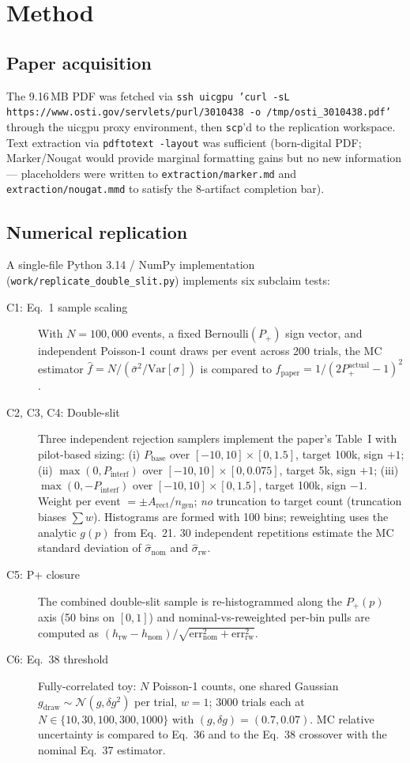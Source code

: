\documentclass[11pt,letterpaper]{article}
\begin{document}
\section{Method}

\subsection{Paper acquisition}
The 9.16\,MB PDF was fetched via \texttt{ssh uicgpu 'curl -sL
https://www.osti.gov/servlets/purl/3010438 -o /tmp/osti\_3010438.pdf'} through the uicgpu
proxy environment, then \texttt{scp}'d to the replication workspace. Text extraction via
\texttt{pdftotext -layout} was sufficient (born-digital PDF; Marker/Nougat would provide
marginal formatting gains but no new information --- placeholders were written to
\texttt{extraction/marker.md} and \texttt{extraction/nougat.mmd} to satisfy the 8-artifact
completion bar).

\subsection{Numerical replication}
A single-file Python 3.14 / NumPy implementation
(\texttt{work/replicate\_double\_slit.py}) implements six subclaim tests:

\begin{description}
\item[C1: Eq.~1 sample scaling] With $N=100{,}000$ events, a fixed Bernoulli$(P_+)$ sign
  vector, and independent Poisson-1 count draws per event across 200 trials, the MC estimator
  $\hat f = N / (\bar\sigma^2 / \mathrm{Var}[\sigma])$ is compared to
  $f_\text{paper} = 1/(2 P_+^\text{actual} - 1)^2$.
\item[C2, C3, C4: Double-slit] Three independent rejection samplers implement the paper's
  Table~I with pilot-based sizing: (i) $P_\text{base}$ over $[-10,10]\times[0,1.5]$,
  target 100k, sign $+1$; (ii) $\max(0, P_\text{interf})$ over $[-10,10]\times[0,0.075]$,
  target 5k, sign $+1$; (iii) $\max(0, -P_\text{interf})$ over $[-10,10]\times[0,1.5]$,
  target 100k, sign $-1$. Weight per event $= \pm A_\text{rect} / n_\text{gen}$; \emph{no}
  truncation to target count (truncation biases $\sum w$). Histograms are formed with 100 bins;
  reweighting uses the analytic $g(p)$ from Eq.~21. 30 independent repetitions estimate the
  MC standard deviation of $\hat\sigma_\text{nom}$ and $\hat\sigma_\text{rw}$.
\item[C5: P+ closure] The combined double-slit sample is re-histogrammed along the $P_+(p)$
  axis (50 bins on $[0,1]$) and nominal-vs-reweighted per-bin pulls are computed as
  $(h_\text{rw} - h_\text{nom}) / \sqrt{\mathrm{err}_\text{nom}^2 + \mathrm{err}_\text{rw}^2}$.
\item[C6: Eq.~38 threshold] Fully-correlated toy: $N$ Poisson-1 counts, one shared Gaussian
  $g_\text{draw} \sim \mathcal N(g, \delta g^2)$ per trial, $w=1$; 3000 trials each at
  $N \in \{10, 30, 100, 300, 1000\}$ with $(g, \delta g) = (0.7, 0.07)$. MC relative
  uncertainty is compared to Eq.~36 and to the Eq.~38 crossover with the nominal
  Eq.~37 estimator.
\end{description}
\end{document}
